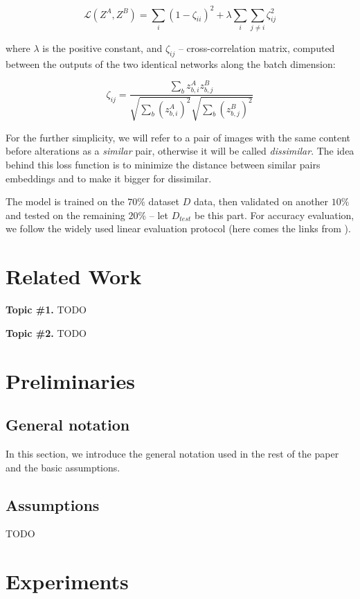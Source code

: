 \documentclass{article}
\begin{document}
$$ \mathcal{L}(Z^A, Z^B) = \sum_i {(1 - \zeta_{ii})^2} + \lambda \sum_{i}\sum_{j \neq i}{\zeta_{ij}^2} $$

where $\lambda$ is the positive constant, and $\zeta_{ij}$ -- cross-correlation matrix, 
computed between the outputs of the two identical networks along the batch dimension:

$$ \zeta_{ij} = 
\frac{\sum_b{z_{b,i}^A z_{b,j}^B}}{\sqrt{\sum_b{(z_{b,i}^A)^2}}\sqrt{\sum_b{(z_{b,j}^B)^2}}} $$

For the further simplicity, we will refer to a pair of images with the same content 
before alterations as a \textit{similar} pair, otherwise it will be called \textit{dissimilar}. 
The idea behind this loss function is to minimize the distance between similar pairs embeddings 
and to make it bigger for dissimilar.

The model is trained on the $70\%$ dataset $D$ data, then validated on another $10\%$ 
and tested on the remaining $20\%$ -- let $D_{test}$ be this part. For accuracy evaluation, 
we follow the widely used linear evaluation protocol (here comes the links from \cite{chen2020simclr}).

\section{Related Work}\label{sec:rw}

\textbf{Topic \#1.}
TODO

\textbf{Topic \#2.}
TODO

\section{Preliminaries}\label{sec:prelim}

\subsection{General notation}

In this section, we introduce the general notation used in the rest of the paper and the basic assumptions. 

\subsection{Assumptions} 

TODO

\section{Experiments}\label{sec:exp}
\end{document}
